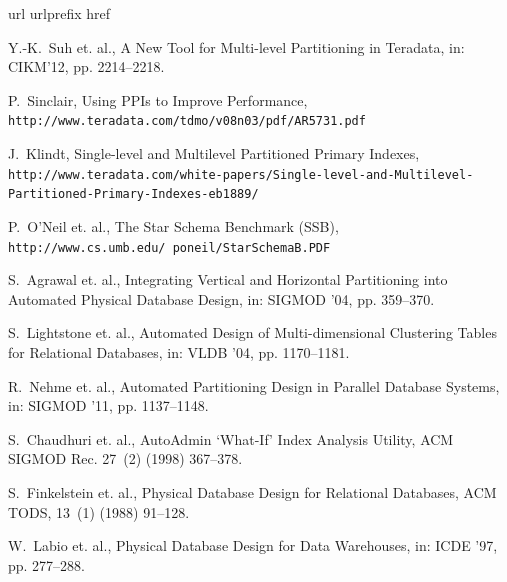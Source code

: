 \documentclass[paper]{ieice}
\begin{document}
\begin{thebibliography}{99}
\expandafter\ifx\csname url\endcsname\relax
  \def\url#1{\texttt{#1}}\fi
\expandafter\ifx\csname urlprefix\endcsname\relax\def\urlprefix{URL }\fi
\expandafter\ifx\csname href\endcsname\relax
  \def\href#1#2{#2} \def\path#1{#1}\fi

{\footnotesize

{Y.-K.~Suh et. al.}, {A New Tool for Multi-level Partitioning in Teradata}, 
in: CIKM'12, pp. 2214--2218.
  
P.~Sinclair, {Using PPIs to Improve Performance},
  \url{http://www.teradata.com/tdmo/v08n03/pdf/AR5731.pdf}

J.~Klindt, {Single-level and Multilevel Partitioned \hbox{Primary} Indexes},
  \url{http://www.teradata.com/white-papers/Single}\linebreak\url{-level-and-Multilevel-Partitioned-Primary-Indexes}\linebreak\url{-eb1889/}

{P.~O’Neil et. al.}, {The Star Schema Benchmark (SSB)},
  \url{http://www.cs.umb.edu/~poneil/StarSchemaB.PDF} 

{S.~Agrawal et. al.}, {Integrating Vertical and Horizontal \hbox{Partitioning} into Automated Physical Database Design}, 
in: \hbox{SIGMOD} '04, pp. 359--370.

{S.~Lightstone et. al.}, {Automated Design of
  \hbox{Multi-dimensional} Clustering Tables for Relational Databases}, in:
  VLDB '04, pp. 1170--1181.

{R.~Nehme et. al.}, {Automated Partitioning Design in Parallel
  Database Systems}, in: SIGMOD '11, pp. 1137--1148.

{S.~Chaudhuri et. al.}, {AutoAdmin `What-If' Index Analysis Utility}, ACM SIGMOD Rec. 27~(2) (1998) 367--378.

{S.~Finkelstein et. al.}, {Physical Database Design for \hbox{Relational} Databases}, ACM TODS, 13~(1) (1988) 91--128.

{W.~Labio et. al.}, {Physical Database Design for Data Warehouses}, in: ICDE '97, pp. 277--288.

}
\end{thebibliography}
\end{document}
